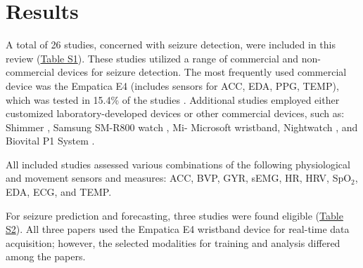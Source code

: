 \section{Results}

A total of 26 studies, concerned with seizure detection, were included in this review (\href{https://docs.google.com/spreadsheets/d/1FjxwkHFbNDM84nuqg513gR_0vIVql-evoT1EMiqSYZU/edit?pli=1&gid=1255223968#gid=1255223968}{Table S1}). These studies utilized a range of commercial and non-commercial devices for seizure detection. The most frequently used commercial device was the Empatica E4 (includes sensors for ACC, EDA, PPG, TEMP), which was tested in 15.4\% of the studies \cite{Yu2023-ss, Regalia2019-ch,Nasseri2021-xn, Tang2021-td}. Additional studies employed either customized laboratory-developed devices or other commercial devices, such as: Shimmer \cite{Van_Andel2017-yx, Gheryani2017-yg}, Samsung SM-R800 watch \cite{Vakilna2024-hk}, Mi- Microsoft wristband\cite{Jiang2022-zu}, Nightwatch \cite{Arends2018-ew}, and Biovital P1 System \cite{Wu2024-yl, Wang2025-ql}.

All included studies assessed various combinations of the following physiological and movement sensors and measures: ACC, BVP, GYR, sEMG, HR, HRV, SpO$_2$, EDA, ECG, and TEMP.

For seizure prediction and forecasting, three studies were found eligible \cite{Vieluf2023-ta,Vieluf2023-zv,Meisel2020-ii} (\href{https://docs.google.com/spreadsheets/d/1FjxwkHFbNDM84nuqg513gR_0vIVql-evoT1EMiqSYZU/edit?pli=1&gid=97270185#gid=97270185}{Table S2}). All three papers used the Empatica E4 wristband device for real-time data acquisition; however, the selected modalities for training and analysis differed among the papers.







